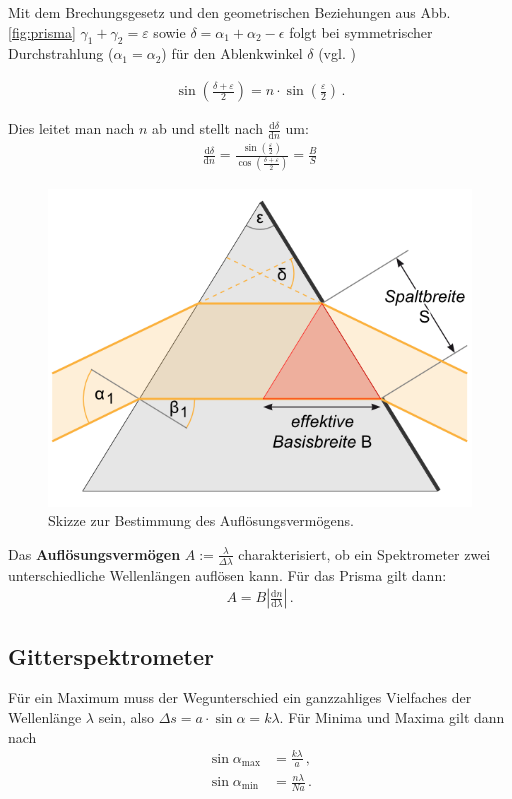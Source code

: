 \documentclass[12pt,a4paper,titlepage,headinclude,bibtotoc]{scrartcl}
\newcommand{\dif}{\ensuremath{\mathrm{d}}}
\begin{document}
Mit dem Brechungsgesetz  und den geometrischen Beziehungen aus Abb.\ref{fig:prisma} $\gamma_1+\gamma_2=\varepsilon$ sowie $\delta=\alpha_1+\alpha_2-\epsilon$ folgt bei symmetrischer Durchstrahlung ($\alpha_1=\alpha_2$) für den Ablenkwinkel $\delta$ (vgl. \cite[S.187f.]{hecht})

\begin{align}
	\sin\left(\frac{\delta+\varepsilon}{2}\right)=n\cdot\sin\left(\frac{\varepsilon}{2}\right)\,.
\end{align}

Dies leitet man nach $n$ ab und stellt nach $\frac{\dif \delta}{\dif n}$ um:
\begin{align}
	\frac{\dif \delta}{\dif n}=\frac{\sin\left(\frac{\varepsilon}{2}\right)}{\cos\left(\frac{\delta+\varepsilon}{2}\right)}=\frac{B}{S}
\end{align}

\begin{figure}[!h]
	\centering
	\includegraphics[scale=0.6]{Prisma2.png}
	\caption{Skizze zur Bestimmung des Auflösungsvermögens. \cite[Datum: 28.12.2014]{LP19}}
	\label{fig:prisma2}
\end{figure}

Das \textbf{Auflösungsvermögen} $A:=\frac{\lambda}{\Delta\lambda}$ charakterisiert, ob ein Spektrometer zwei unterschiedliche Wellenlängen auflösen kann.
Für das Prisma gilt dann:
\begin{align}
	A=B\left|\frac{\dif n}{\dif \lambda}\right|\,.
\end{align}

\subsection{Gitterspektrometer}
Für ein Maximum muss der Wegunterschied ein ganzzahliges Vielfaches der Wellenlänge $\lambda$ sein, also $\Delta s=a \cdot \sin \alpha=k \lambda$.
Für Minima und Maxima gilt dann nach \cite[S.461ff.]{hecht}
\begin{align}
	\sin\alpha_\text{max}&=\frac{k\lambda}{a}\,,\\
	\sin\alpha_\text{min}&=\frac{n\lambda}{Na}\,.
\end{align}
\end{document}
